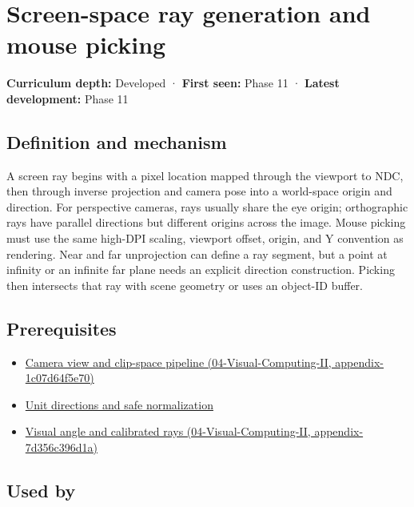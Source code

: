 \hypertarget{appendix-f1a6d43e80d1}{}
\section{Screen-space ray generation and mouse picking}\label{appendix-f1a6d43e80d1-screen-space-ray-generation-and-mouse-picking}

\textbf{Curriculum depth:} Developed · \textbf{First seen:} Phase 11 · \textbf{Latest development:} Phase 11

\subsection{Definition and mechanism}\label{appendix-f1a6d43e80d1-definition-and-mechanism}

A screen ray begins with a pixel location mapped through the viewport to NDC, then through inverse projection and camera pose into a world-space origin and direction. For perspective cameras, rays usually share the eye origin; orthographic rays have parallel directions but different origins across the image. Mouse picking must use the same high-DPI scaling, viewport offset, origin, and Y convention as rendering. Near and far unprojection can define a ray segment, but a point at infinity or an infinite far plane needs an explicit direction construction. Picking then intersects that ray with scene geometry or uses an object-ID buffer.

\subsection{Prerequisites}\label{appendix-f1a6d43e80d1-prerequisites}

\begin{itemize}
\tightlist
\item
  \href{../04-Visual-Computing-II/main.pdf\#nameddest=appendix-1c07d64f5e70}{Camera view and clip-space pipeline (04-Visual-Computing-II, appendix-1c07d64f5e70)}
\item
  \hyperref[appendix-f744e41b95b4]{Unit directions and safe normalization}
\item
  \href{../04-Visual-Computing-II/main.pdf\#nameddest=appendix-7d356c396d1a}{Visual angle and calibrated rays (04-Visual-Computing-II, appendix-7d356c396d1a)}
\end{itemize}

\subsection{Used by}\label{appendix-f1a6d43e80d1-used-by}

